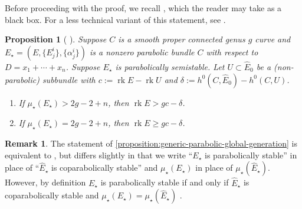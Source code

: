 \documentclass[12 pt]{amsart}
\theoremstyle{plain}
\newtheorem{proposition}[subsubsection]{Proposition}
\theoremstyle{definition}
\newtheorem{remark}[subsubsection]{Remark}
\theoremstyle{remark}
\numberwithin{equation}{section}
\DeclareMathOperator\rk{rk}
\begin{document}
Before proceeding with the proof, we
recall \cite[Proposition 6.3.6]{LL:geometric-local-systems}, which the
reader may take as a black box.
For a less technical variant of this statement, see 
\cite[Proposition 6.3.1]{LL:geometric-local-systems}. 
\begin{proposition}[{ \cite[Proposition 6.3.6]{LL:geometric-local-systems}}]
	\label{proposition:generic-parabolic-global-generation}
	Suppose $C$ is a smooth proper connected genus $g$ curve and
	$E_\star = (E, \{E^i_j\}, \{\alpha^i_j\})$ is a nonzero parabolic bundle $C$
	with respect to $D = x_1 + \cdots + x_n$.
		Suppose $E_\star$ is parabolically semistable. 
	Let $U \subset \widehat E_0$ be a (non-parabolic) subbundle with
		$c := \rk E - \rk U$ and
		$\delta := h^0(C, \widehat{E}_0) - h^0(C, U)$. 
	\begin{enumerate}
		\item[(I)] If $\mu_\star({E}_\star)> 2g-2 + n$, 
		then $\rk E >
			gc - \delta$.
		\item[(II)] If $\mu_\star({E}_\star)= 2g-2+n$, then $\rk
			E \geq gc - \delta$.
	\end{enumerate}
\end{proposition}
\begin{remark}
\label{remark:}
The statement of \autoref{proposition:generic-parabolic-global-generation} is equivalent to \cite[Proposition
6.3.6]{LL:geometric-local-systems}, but differs slightly in that we write
``$E_\star$ is parabolically stable'' in place of ``$\widehat{E}_\star$ is
coparabolically stable'' and $\mu_\star(E_\star)$ in place of
$\mu_\star(\widehat{E}_\star)$.
However, by definition 
$E_\star$ is parabolically stable if and only if $\widehat{E}_\star$ is
coparabolically stable and $\mu_\star(E_\star) = \mu_\star(\widehat{E}_\star)$
\cite[Definitions 2.2.9 and 2.4.2]{LL:geometric-local-systems}.
\end{remark}
\end{document}
